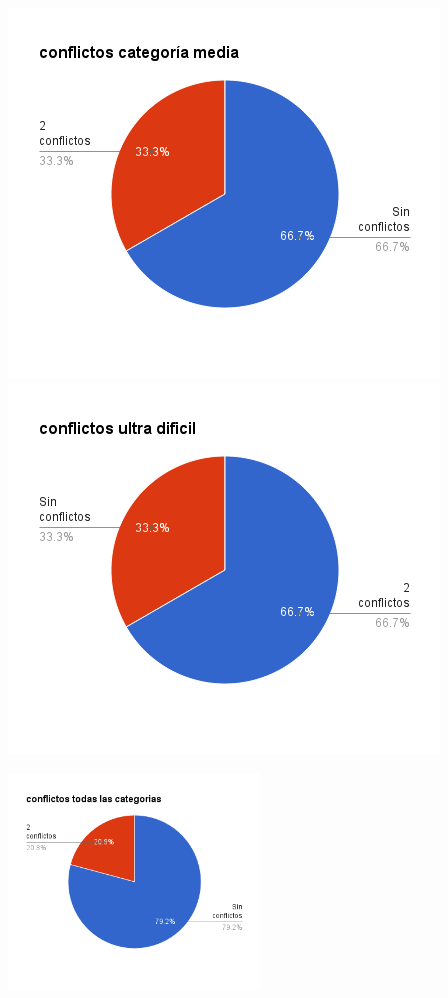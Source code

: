 \documentclass[a4paper,spanish]{article}
\begin{document}
\begin{minipage}{0.50\textwidth}
	\includegraphics[width=\textwidth]{./graficos/conflictosMedia.png}
	\includegraphics[width=\textwidth]{./graficos/conflictosUltraDificil.png}

\end{minipage}

\begin{center}
\includegraphics[width=0.5\textwidth]{./graficos/conflictosTodas.png}
\end{center}
\end{document}
